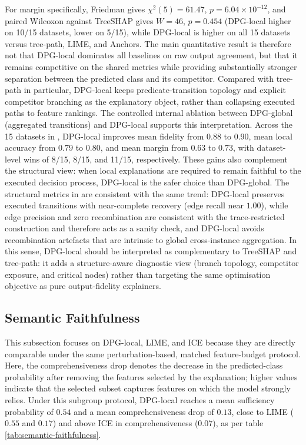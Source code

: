 \documentclass[runningheads]{llncs}
\begin{document}
 For margin specifically, Friedman gives $\chi^2(5)=61.47$, $p=6.04\times 10^{-12}$, and paired Wilcoxon against TreeSHAP gives $W=46$, $p=0.454$ (DPG-local higher on 10/15 datasets, lower on 5/15), while DPG-local is higher on all 15 datasets versus tree-path, LIME, and Anchors. The main quantitative result is therefore not that DPG-local dominates all baselines on raw output agreement, but that it remains competitive on the shared metrics while providing substantially stronger separation between the predicted class and its competitor. Compared with tree-path in particular, DPG-local keeps predicate-transition topology and explicit competitor branching as the explanatory object, rather than collapsing executed paths to feature rankings. The controlled internal ablation between DPG-global (aggregated transitions) and DPG-local supports this interpretation. Across the 15 datasets in , DPG-local improves mean fidelity from $0.88$ to $0.90$, mean local accuracy from $0.79$ to $0.80$, and mean margin from $0.63$ to $0.73$, with dataset-level wins of 8/15, 8/15, and 11/15, respectively. These gains also complement the structural view: when local explanations are required to remain faithful to the executed decision process, DPG-local is the safer choice than DPG-global. The structural metrics in  are consistent with the same trend: DPG-local preserves executed transitions with near-complete recovery (edge recall near $1.00$), while edge precision and zero recombination are consistent with the trace-restricted construction and therefore acts as a sanity check, and DPG-local avoids recombination artefacts that are intrinsic to global cross-instance
aggregation.
In this sense, DPG-local should be interpreted as complementary to TreeSHAP and tree-path: it adds a structure-aware diagnostic view (branch topology, competitor exposure, and critical nodes) rather than targeting the same optimisation objective as pure output-fidelity explainers.

\subsection{Semantic Faithfulness}
This subsection focuses on DPG-local, LIME, and ICE because they are directly comparable under the same perturbation-based, matched feature-budget protocol. Here, the comprehensiveness drop denotes the decrease in the predicted-class probability after removing the features selected by the explanation; higher values indicate that the selected subset captures features on which the model strongly relies. Under this subgroup protocol, DPG-local reaches a mean sufficiency probability of $0.54$ and a mean comprehensiveness drop of $0.13$, close to LIME ($0.55$ and $0.17$) and above ICE in comprehensiveness
($0.07$), as per table \ref{tab:semantic-faithfulness}.
\end{document}

